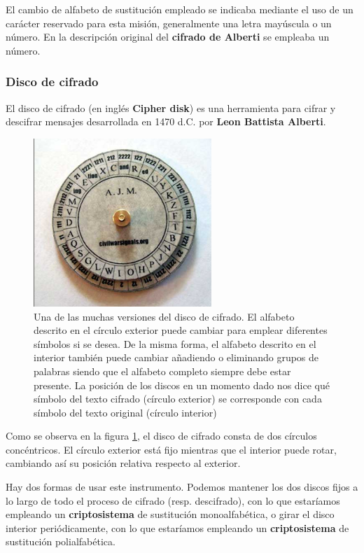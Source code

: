 \documentclass[nochap]{apuntesURJC}
\begin{document}
El cambio de alfabeto de sustitución empleado se indicaba mediante el uso de un carácter reservado para esta misión, generalmente una letra mayúscula o un número. En la descripción original del \textbf{cifrado de Alberti} se empleaba un número.

\subsubsection{Disco de cifrado}
El disco de cifrado (en inglés \textbf{Cipher disk}) es una herramienta para cifrar y descifrar mensajes desarrollada en 1470 d.C. por \textbf{Leon Battista Alberti}.

\begin{figure}[hbtp]
\centering
\includegraphics[width=0.6\textwidth]{img/cipher_disk.png}
\caption{Una de las muchas versiones del disco de cifrado. El alfabeto descrito en el círculo exterior puede cambiar para emplear diferentes símbolos si se desea. De la misma forma, el alfabeto descrito en el interior también puede cambiar añadiendo o eliminando grupos de palabras siendo que el alfabeto completo siempre debe estar presente. La posición de los discos en un momento dado nos dice qué símbolo del texto cifrado (círculo exterior) se corresponde con cada símbolo del texto original (círculo interior)}
\label{fig:cipher_disk}
\end{figure}

Como se observa en la figura \ref{fig:cipher_disk}, el disco de cifrado consta de dos círculos concéntricos. El círculo exterior está fijo mientras que el interior puede rotar, cambiando así su posición relativa respecto al exterior.

Hay dos formas de usar este instrumento. Podemos mantener los dos discos fijos a lo largo de todo el proceso de cifrado (resp. descifrado), con lo que estaríamos empleando un \textbf{criptosistema} de sustitución monoalfabética, o girar el disco interior periódicamente, con lo que estaríamos empleando un \textbf{criptosistema} de sustitución polialfabética.
\end{document}
